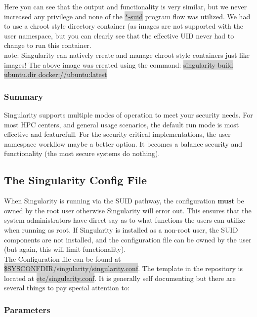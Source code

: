\documentclass[a4paper]{article}
\begin{document}
Here you can see that the output and functionality is very similar, but we never increased any privilege and none of the \colorbox{lightgray}{*-suid} program flow was utilized. We had to use a chroot style directory container (as images are not supported with the user namespace, but you can clearly see that the effective UID never had to change to run this container.\\[0.1in]

note: Singularity can natively create and manage chroot style containers just like images! The above image was created using the command: \colorbox{lightgray}{singularity build ubuntu.dir docker://ubuntu:latest}

\subsubsection{Summary}
Singularity supports multiple modes of operation to meet your security needs. For most HPC centers, and general usage scenarios, the default run mode is most effective and featurefull. For the security critical implementations, the user namespace workflow maybe a better option. It becomes a balance security and functionality (the most secure systems do nothing).

\subsection{The Singularity Config File}

When Singularity is running via the SUID pathway, the configuration \textbf{must} be owned by the root user otherwise Singularity will error out. This ensures that the system administrators have direct say as to what functions the users can utilize when running as root. If Singularity is installed as a non-root user, the SUID components are not installed, and the configuration file can be owned by the user (but again, this will limit functionality).\\[0.1in]

The Configuration file can be found at \colorbox{lightgray}{\$SYSCONFDIR/singularity/singularity.conf}. The template in the repository is located at \colorbox{lightgray}{etc/singularity.conf}. It is generally self documenting but there are several things to pay special attention to:

\subsubsection{Parameters}
\end{document}
